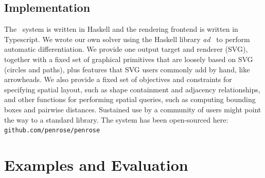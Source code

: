 
\subsection{Implementation}
\label{sec:Implementation}

The \Penrose\ system is written in Haskell and the rendering frontend is written in Typescript. We wrote our own solver using the Haskell library \textit{ad}~\cite{autodiff:kmett} to perform automatic differentiation. We provide one output target and renderer (SVG), together with a fixed set of graphical primitives that are loosely based on SVG (\eg circles and paths), plus features that SVG users commonly add by hand, like arrowheads. We also provide a fixed set of objectives and constraints for specifying spatial layout, such as shape containment and adjacency relationships, and other functions for performing spatial queries, such as computing bounding boxes and pairwise distances. Sustained use by a community of users might point the way to a standard library. The system has been open-sourced here: \texttt{github.com/penrose/penrose}


\section{Examples and Evaluation}
\label{sec:ExamplesandEvaluation}



